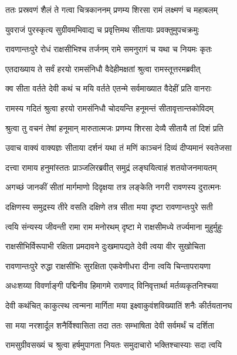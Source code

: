 
\twolineshloka
{ततः प्रस्रवणं शैलं ते गत्वा चित्रकाननम्}
{प्रणम्य शिरसा रामं लक्ष्मणं च महाबलम्} %

\twolineshloka
{युवराजं पुरस्कृत्य सुग्रीवमभिवाद्य च}
{प्रवृत्तिमथ सीतायाः प्रवक्तुमुपचक्रमुः} %

\twolineshloka
{रावणान्तःपुरे रोधं राक्षसीभिश्च तर्जनम्}
{रामे समनुरागं च यथा च नियमः कृतः} %

\twolineshloka
{एतदाख्याय ते सर्वं हरयो रामसंनिधौ}
{वैदेहीमक्षतां श्रुत्वा रामस्तूत्तरमब्रवीत्} %

\twolineshloka
{क्व सीता वर्तते देवी कथं च मयि वर्तते}
{एतन्मे सर्वमाख्यात वैदेहीं प्रति वानराः} %

\twolineshloka
{रामस्य गदितं श्रुत्वा हरयो रामसंनिधौ}
{चोदयन्ति हनूमन्तं सीतावृत्तान्तकोविदम्} %

\twolineshloka
{श्रुत्वा तु वचनं तेषां हनूमान् मारुतात्मजः}
{प्रणम्य शिरसा देव्यै सीतायै तां दिशं प्रति} %

\twolineshloka
{उवाच वाक्यं वाक्यज्ञः सीताया दर्शनं यथा}
{तं मणिं काञ्चनं दिव्यं दीप्यमानं स्वतेजसा} %

\twolineshloka
{दत्त्वा रामाय हनुमांस्ततः प्राञ्जलिरब्रवीत्}
{समुद्रं लङ्घयित्वाहं शतयोजनमायतम्} %

\twolineshloka
{अगच्छं जानकीं सीतां मार्गमाणो दिदृक्षया}
{तत्र लङ्केति नगरी रावणस्य दुरात्मनः} %

\twolineshloka
{दक्षिणस्य समुद्रस्य तीरे वसति दक्षिणे}
{तत्र सीता मया दृष्टा रावणान्तःपुरे सती} %

\twolineshloka
{त्वयि संन्यस्य जीवन्ती रामा राम मनोरथम्}
{दृष्टा मे राक्षसीमध्ये तर्ज्यमाना मुहुर्मुहुः} %

\twolineshloka
{राक्षसीभिर्विरूपाभी रक्षिता प्रमदावने}
{दुःखमापद्यते देवी त्वया वीर सुखोचिता} %

\twolineshloka
{रावणान्तःपुरे रुद्धा राक्षसीभिः सुरक्षिता}
{एकवेणीधरा दीना त्वयि चिन्तापरायणा} %

\twolineshloka
{अधःशय्या विवर्णाङ्गी पद्मिनीव हिमागमे}
{रावणाद् विनिवृत्तार्था मर्तव्यकृतनिश्चया} %

\twolineshloka
{देवी कथंचित् काकुत्स्थ त्वन्मना मार्गिता मया}
{इक्ष्वाकुवंशविख्यातिं शनैः कीर्तयतानघ} %

\twolineshloka
{सा मया नरशार्दूल शनैर्विश्वासिता तदा}
{ततः सम्भाषिता देवी सर्वमर्थं च दर्शिता} %

\twolineshloka
{रामसुग्रीवसख्यं च श्रुत्वा हर्षमुपागता}
{नियतः समुदाचारो भक्तिश्चास्याः सदा त्वयि} %


